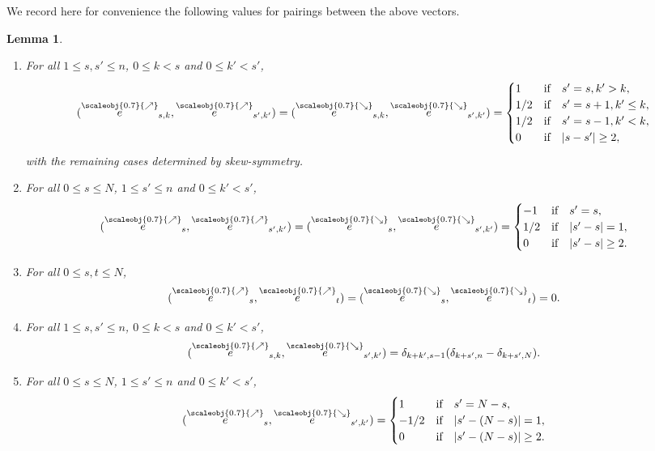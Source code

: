 \documentclass[11pt, reqno]{amsart}
\newtheorem{lemma}[theorem]{Lemma}
\theoremstyle{definition}
\numberwithin{equation}{section}
\newcommand{\nears}{\scaleobj{0.7}{\nearrow}}
\newcommand{\sears}{\scaleobj{0.7}{\searrow}}
\newcommand{\nee}{\overset{\nears}{e}}
\newcommand{\seee}{\overset{\sears}{e}}
\begin{document}
We record here for convenience the following values for pairings between the above vectors. 

\begin{lemma}\label{LemSkewProdFormDiff}
\begin{enumerate}
\item For all $1\leq s,s'\leq n$,  $0\leq k<s$ and $0\leq k'<s'$, 
\begin{equation}\label{EqSameNil}
(\nee_{s,k},\nee_{s',k'}) = (\seee_{s,k},\seee_{s',k'}) =\begin{cases}
1&\text{if}\quad s' = s,k'>k,\\
1/2 &\text{if}\quad s' = s+1,k'\leq k,\\
1/2&\text{if}\quad s'=s-1,k'<k,\\
0& \textrm{if}\quad|s-s'|\geq 2, 
\end{cases}
\end{equation}
with the remaining cases determined by skew-symmetry. 
\item For all $0\leq s\leq N$, $1\leq s'\leq n$ and $0\leq k' < s'$, 
\begin{equation}\label{EqSameCar}
(\nee_s,\nee_{s',k'}) = (\seee_s,\seee_{s',k'}) = \begin{cases}
-1&\text{if}\quad s' = s,\\
1/2 & \text{if} \quad |s'-s|= 1,\\
0&\text{if}\quad |s'-s|\geq 2.
\end{cases}
\end{equation}
\item For all $0\leq s,t\leq N$,\begin{equation}\label{EqVanishing}
(\nee_s,\nee_t) = (\seee_s,\seee_t) = 0.
\end{equation}
\item For all  $1\leq s,s'\leq n$, $0\leq k<s$ and $0\leq k'<s'$,
\begin{equation}\label{EqDiffNil}
(\nee_{s,k},\seee_{s',k'}) = \delta_{k+k',s-1}(\delta_{k+s',n} - \delta_{k+s',N}).
\end{equation}
\item For all $0\leq s\leq N$, $1\leq s'\leq n$ and $0\leq k' < s'$,
\begin{equation}\label{EqDiffCar}
(\nee_s,\seee_{s',k'}) = \begin{cases}
1&\text{if}\quad s' = N-s,\\
-1/2 & \text{if} \quad |s'  -(N-s)|=1,\\
0& \text{if}\quad |s'-(N-s)|\geq 2.
\end{cases}

\end{equation}
\end{enumerate}
\end{lemma}
\end{document}
